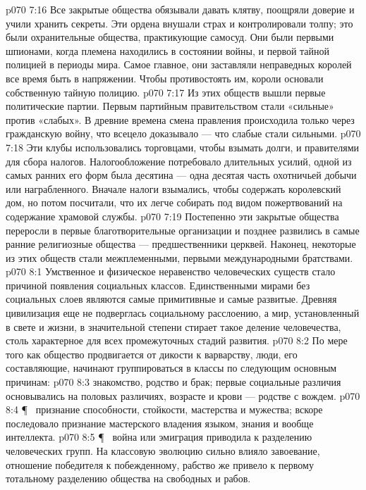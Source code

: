 \vs p070 7:16 Все закрытые общества обязывали давать клятву, поощряли доверие и учили хранить секреты. Эти ордена внушали страх и контролировали толпу; это были охранительные общества, практикующие самосуд. Они были первыми шпионами, когда племена находились в состоянии войны, и первой тайной полицией в периоды мира. Самое главное, они заставляли неправедных королей все время быть в напряжении. Чтобы противостоять им, короли основали собственную тайную полицию.
\vs p070 7:17 Из этих обществ вышли первые политические партии. Первым партийным правительством стали «сильные» против «слабых». В древние времена смена правления происходила только через гражданскую войну, что всецело доказывало --- что слабые стали сильными.
\vs p070 7:18 Эти клубы использовались торговцами, чтобы взымать долги, и правителями для сбора налогов. Налогообложение потребовало длительных усилий, одной из самых ранних его форм была десятина --- одна десятая часть охотничьей добычи или награбленного. Вначале налоги взымались, чтобы содержать королевский дом, но потом посчитали, что их легче собирать под видом пожертвований на содержание храмовой службы.
\vs p070 7:19 Постепенно эти закрытые общества переросли в первые благотворительные организации и позднее развились в самые ранние религиозные общества --- предшественники церквей. Наконец, некоторые из этих обществ стали межплеменными, первыми международными братствами.
\vs p070 8:1 Умственное и физическое неравенство человеческих существ стало причиной появления социальных классов. Единственными мирами без социальных слоев являются самые примитивные и самые развитые. Древняя цивилизация еще не подверглась социальному расслоению, а мир, установленный в свете и жизни, в значительной степени стирает такое деление человечества, столь характерное для всех промежуточных стадий развития.
\vs p070 8:2 По мере того как общество продвигается от дикости к варварству, люди, его составляющие, начинают группироваться в классы по следующим основным причинам:
\vs p070 8:3 \bibnobreakspace {} знакомство, родство и брак; первые социальные различия основывались на половых различиях, возрасте и крови --- родстве с вождем.
\vs p070 8:4 \P\ \bibnobreakspace {} признание способности, стойкости, мастерства и мужества; вскоре последовало признание мастерского владения языком, знания и вообще интеллекта.
\vs p070 8:5 \P\ \bibnobreakspace {} война или эмиграция приводила к разделению человеческих групп. На классовую эволюцию сильно влияло завоевание, отношение победителя к побежденному, рабство же привело к первому тотальному разделению общества на свободных и рабов.

